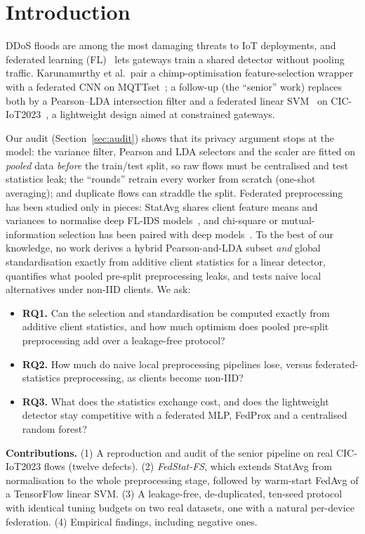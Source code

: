 \section{Introduction}\label{sec:intro}
DDoS floods are among the most damaging threats to IoT deployments, and federated learning (FL)~\cite{mcmahan2017,kairouz2021} lets gateways train a shared detector without pooling traffic. Karunamurthy et al.\ pair a chimp-optimisation feature-selection wrapper with a federated CNN on MQTTset~\cite{karunamurthy2025}; a follow-up (the ``senior'' work) replaces both by a Pearson--LDA intersection filter and a federated linear SVM~\cite{cortes1995} on CIC-IoT2023~\cite{senior2026}, a lightweight design aimed at constrained gateways.

Our audit (Section~\ref{sec:audit}) shows that its privacy argument stops at the model: the variance filter, Pearson and LDA selectors and the scaler are fitted on \emph{pooled} data \emph{before} the train/test split, so raw flows must be centralised and test statistics leak; the ``rounds'' retrain every worker from scratch (one-shot averaging); and duplicate flows can straddle the split. Federated preprocessing has been studied only in pieces: StatAvg shares client feature means and variances to normalise deep FL-IDS models~\cite{bouzinis2025}, and chi-square or mutual-information selection has been paired with deep models~\cite{nguyen2026,fdids2025}. To the best of our knowledge, no work derives a hybrid Pearson-and-LDA subset \emph{and} global standardisation exactly from additive client statistics for a linear detector, quantifies what pooled pre-split preprocessing leaks, and tests naive local alternatives under non-IID clients. We ask:
\begin{itemize}
\item \textbf{RQ1.} Can the selection and standardisation be computed exactly from additive client statistics, and how much optimism does pooled pre-split preprocessing add over a leakage-free protocol?
\item \textbf{RQ2.} How much do naive local preprocessing pipelines lose, versus federated-statistics preprocessing, as clients become non-IID?
\item \textbf{RQ3.} What does the statistics exchange cost, and does the lightweight detector stay competitive with a federated MLP, FedProx and a centralised random forest?
\end{itemize}
\textbf{Contributions.} (1) A reproduction and audit of the senior pipeline on real CIC-IoT2023 flows (twelve defects). (2) \emph{FedStat-FS}, which extends StatAvg from normalisation to the whole preprocessing stage, followed by warm-start FedAvg of a TensorFlow linear SVM. (3) A leakage-free, de-duplicated, ten-seed protocol with identical tuning budgets on two real datasets, one with a natural per-device federation. (4) Empirical findings, including negative ones.
